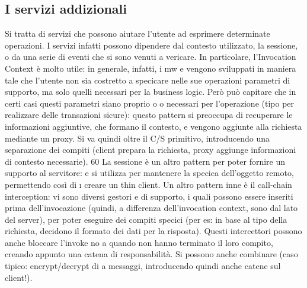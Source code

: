 \documentclass[a4paper,12pt]{article}
\begin{document}
\subsection{I servizi addizionali}
Si tratta di servizi che possono aiutare l'utente ad esprimere determinate operazioni. I servizi infatti possono
dipendere dal contesto utilizzato, la sessione, o
da una serie di eventi che si sono venuti a vericare.
In particolare, l'Invocation Context è molto utile: in generale, infatti, i mw
e
vengono sviluppati in maniera tale che l'utente non sia costretto a specicare
nelle sue operazioni parametri di supporto, ma solo quelli necessari per la business logic. Però può capitare che in
certi casi questi parametri siano proprio
o
o
necessari per l'operazione (tipo per realizzare delle transazioni sicure): questo
pattern si preoccupa di recuperare le informazioni aggiuntive, che formano il
contesto, e vengono aggiunte alla richiesta mediante un proxy. Si va quindi
oltre il C/S primitivo, introducendo una separazione dei compiti (client prepara
la richiesta, proxy aggiunge informazioni di contesto necessarie).
60
La sessione è un altro pattern per poter fornire un supporto al servitore:
e
si utilizza per mantenere la specica dell'oggetto remoto, permettendo così di
\i{}
creare un thin client.
Un altro pattern inne è il call-chain interception: vi sono diversi gestori
e
di supporto, i quali possono essere inseriti prima dell'invocazione (quindi, a
differenza dell'invocation context, sono dal lato del server), per poter eseguire
dei compiti specici (per es: in base al tipo della richiesta, decidono il formato
dei dati per la risposta). Questi intercettori possono anche bloccare l'invoke no
a quando non hanno terminato il loro compito, creando appunto una catena di
responsabilità. Si possono anche combinare (caso tipico: encrypt/decrypt di
a
messaggi, introducendo quindi anche catene sul client!).
\end{document}
